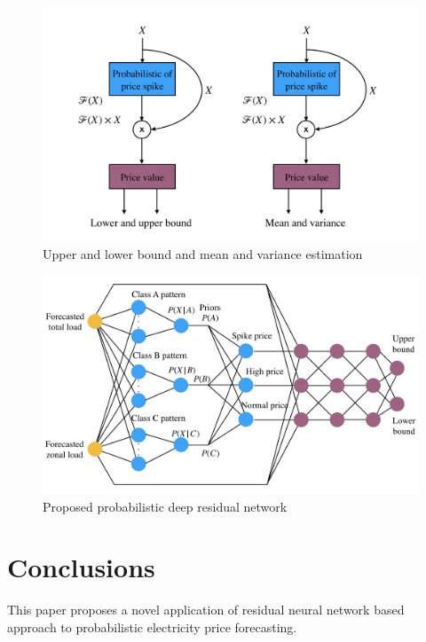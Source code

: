 \documentclass[review]{elsarticle}
\begin{document}
  \begin{figure}[H]
    \caption{Upper and lower bound and mean and variance estimation}
    \label{Fig:UB_LB_MV_PDRN}
    \includegraphics[width=12cm]{UB_LB_MV_PDRN}
  \centering
  \end{figure}

  \begin{figure}[H]
    \caption{Proposed probabilistic deep residual network}
    \label{Fig:proposed_PDRN}
    \includegraphics[width=12cm]{proposed_PDRN}
  \centering
  \end{figure}


\section{Conclusions}
This paper proposes a novel application of residual neural network based approach to probabilistic electricity price forecasting.
\end{document}
